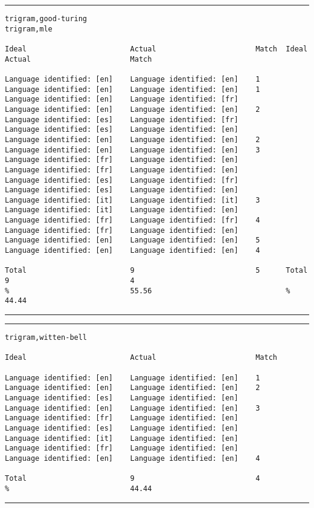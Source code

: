 \tiny
\hrule\vskip4pt
\begin{verbatim}
trigram,good-turing                                              trigram,mle

Ideal                        Actual                       Match  Ideal                        Actual                       Match

Language identified: [en]    Language identified: [en]    1      Language identified: [en]    Language identified: [en]    1
Language identified: [en]    Language identified: [fr]           Language identified: [en]    Language identified: [en]    2
Language identified: [es]    Language identified: [fr]           Language identified: [es]    Language identified: [en]
Language identified: [en]    Language identified: [en]    2      Language identified: [en]    Language identified: [en]    3
Language identified: [fr]    Language identified: [en]           Language identified: [fr]    Language identified: [en]
Language identified: [es]    Language identified: [fr]           Language identified: [es]    Language identified: [en]
Language identified: [it]    Language identified: [it]    3      Language identified: [it]    Language identified: [en]
Language identified: [fr]    Language identified: [fr]    4      Language identified: [fr]    Language identified: [en]
Language identified: [en]    Language identified: [en]    5      Language identified: [en]    Language identified: [en]    4

Total                        9                            5      Total                        9                            4
%                            55.56                               %                            44.44
\end{verbatim}
\vskip4pt\hrule

\tiny
\hrule\vskip4pt
\begin{verbatim}
trigram,witten-bell

Ideal                        Actual                       Match

Language identified: [en]    Language identified: [en]    1
Language identified: [en]    Language identified: [en]    2
Language identified: [es]    Language identified: [en]
Language identified: [en]    Language identified: [en]    3
Language identified: [fr]    Language identified: [en]
Language identified: [es]    Language identified: [en]
Language identified: [it]    Language identified: [en]
Language identified: [fr]    Language identified: [en]
Language identified: [en]    Language identified: [en]    4

Total                        9                            4
%                            44.44
\end{verbatim}
\vskip4pt\hrule

